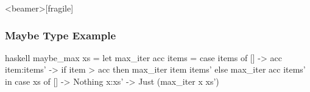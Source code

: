 \documentclass[dvipsnames]{beamer}
\theoremstyle{plain}
\begin{document}
\begin{frame}<beamer>[fragile]
  \frametitle{Maybe Type Example}

  \begin{example}
    \begin{pygments}{haskell}
maybe_max xs =
    let
       max_iter acc items =
           case items of
             [] -> acc
             item:items' -> if item > acc
                            then max_iter item items'
                            else max_iter acc items'
    in
        case xs of
          [] -> Nothing
          x:xs' -> Just (max_iter x xs')
    \end{pygments}
  \end{example}
\end{frame}

% 
% 
% 
% 
% 
% 
% 
% 
\end{document}
